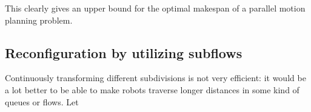 This clearly gives an upper bound for the optimal makespan of a parallel motion planning problem.


\subsection{Reconfiguration by utilizing subflows}


Continuously transforming different subdivisions is not very efficient: it would be a lot better to be able to make robots traverse longer distances in some kind of queues or flows. Let  \cite{siamcomp/DemaineFKMS19} 


